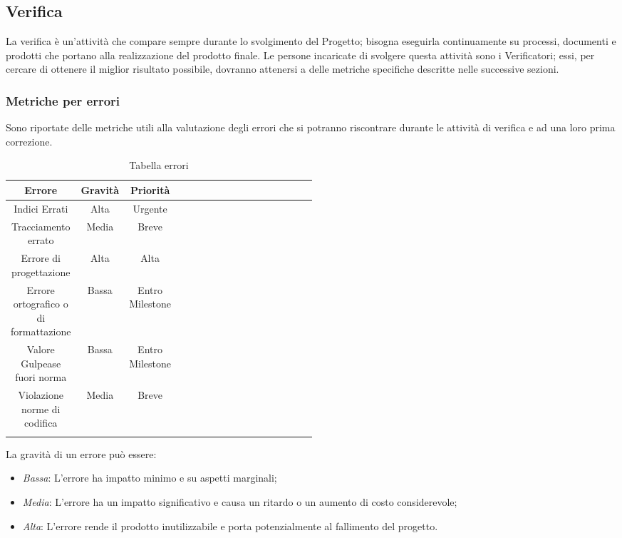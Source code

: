 \newpage
\subsection{Verifica}
La verifica è un'attività che compare sempre durante lo svolgimento del Progetto; bisogna eseguirla continuamente su processi, documenti e prodotti che portano alla realizzazione del prodotto finale. Le persone incaricate di svolgere questa attività sono i Verificatori; essi, per cercare di ottenere il miglior risultato possibile, dovranno attenersi a delle metriche specifiche descritte nelle successive sezioni.
\label{11.0}

\subsubsection{Metriche per errori}
Sono riportate delle metriche utili alla valutazione degli errori che si potranno riscontrare durante le attività di verifica e ad una loro prima correzione.
\begin{center}
\begin{longtable}{|c|c|c|p{0.5\linewidth}|}
\toprule
\textbf{Errore} & \textbf{Gravità} & \textbf{Priorità} \\

\midrule
Indici Errati & Alta & Urgente\\
\midrule
Tracciamento errato & Media & Breve\\
\midrule
Errore di progettazione & Alta & Alta\\
\midrule
Errore ortografico o di formattazione & Bassa & Entro Milestone\\
\midrule
Valore Gulpease fuori norma & Bassa & Entro Milestone\\
\midrule
Violazione norme di codifica & Media & Breve\\

\bottomrule
\caption{Tabella errori}
\label{tab:changelog}
\end{longtable}
\end{center}

La gravità di un errore può essere:

\begin{itemize}
\item \emph{Bassa}: L'errore ha impatto minimo e su aspetti marginali;
\item \emph{Media}: L'errore ha un impatto significativo e causa un ritardo o un aumento di costo considerevole;
\item \emph{Alta}: L'errore rende il prodotto inutilizzabile e porta potenzialmente al fallimento del progetto.
\end{itemize}

